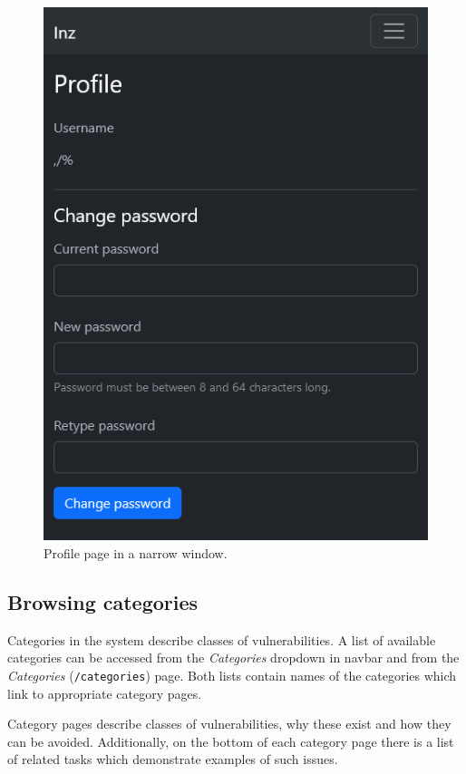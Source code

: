 \begin{figure}
    \centering
    \includegraphics{img/manual-profile.png}
    \caption{Profile page in a narrow window.}
    \label{fig:manual-profile}
\end{figure}

\subsection{Browsing categories}

Categories in the system describe classes of vulnerabilities. A list of available categories can be accessed from the \textit{Categories} dropdown in navbar and from the \textit{Categories} (\texttt{/categories}) page. Both lists contain names of the categories which link to appropriate category pages.


Category pages describe classes of vulnerabilities, why these exist and how they can be avoided. Additionally, on the bottom of each category page there is a list of related tasks which demonstrate examples of such issues.

